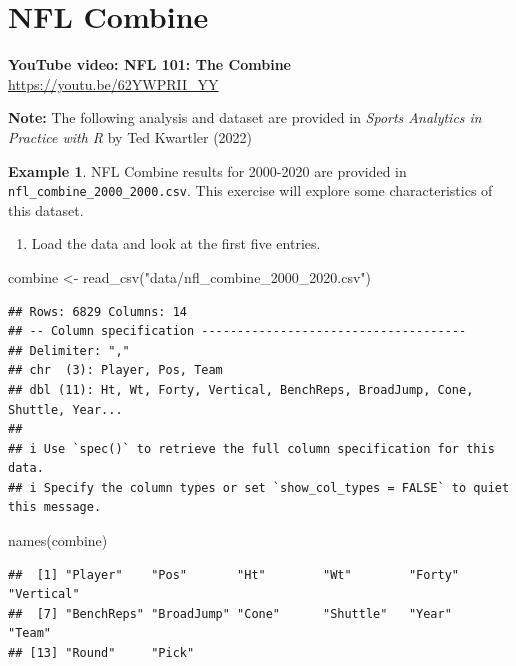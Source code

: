 \documentclass[
  11pt,
]{book}
\newenvironment{Shaded}{\begin{snugshade}}{\end{snugshade}}
\newcommand{\FunctionTok}[1]{\textcolor[rgb]{0.00,0.00,0.00}{#1}}
\newcommand{\NormalTok}[1]{#1}
\newcommand{\OtherTok}[1]{\textcolor[rgb]{0.56,0.35,0.01}{#1}}
\newcommand{\StringTok}[1]{\textcolor[rgb]{0.31,0.60,0.02}{#1}}
\providecommand{\tightlist}{%
  \setlength{\itemsep}{0pt}\setlength{\parskip}{0pt}}
\theoremstyle{definition}
\theoremstyle{definition}
\newtheorem{example}{Example}[chapter]
\theoremstyle{definition}
\theoremstyle{definition}
\theoremstyle{remark}
\begin{document}
\hypertarget{nfl-combine}{%
\section{NFL Combine}\label{nfl-combine}}

\textbf{YouTube video: NFL 101: The Combine}\\
\url{https://youtu.be/62YWPRII_YY}

\textbf{Note:} The following analysis and dataset are provided in \emph{Sports Analytics in Practice with R} by Ted Kwartler (2022)\\

\begin{example}
NFL Combine results for 2000-2020 are provided in \texttt{nfl\_combine\_2000\_2000.csv}. This exercise will explore some characteristics of this dataset.
\end{example}

\begin{enumerate}
\def\labelenumi{(\alph{enumi})}
\tightlist
\item
  Load the data and look at the first five entries.
\end{enumerate}

\begin{Shaded}
\begin{Highlighting}[]
\NormalTok{combine }\OtherTok{\textless{}{-}} \FunctionTok{read\_csv}\NormalTok{(}\StringTok{"data/nfl\_combine\_2000\_2020.csv"}\NormalTok{)}
\end{Highlighting}
\end{Shaded}

\begin{verbatim}
## Rows: 6829 Columns: 14
## -- Column specification -------------------------------------
## Delimiter: ","
## chr  (3): Player, Pos, Team
## dbl (11): Ht, Wt, Forty, Vertical, BenchReps, BroadJump, Cone, Shuttle, Year...
## 
## i Use `spec()` to retrieve the full column specification for this data.
## i Specify the column types or set `show_col_types = FALSE` to quiet this message.
\end{verbatim}

\begin{Shaded}
\begin{Highlighting}[]
\FunctionTok{names}\NormalTok{(combine)}
\end{Highlighting}
\end{Shaded}

\begin{verbatim}
##  [1] "Player"    "Pos"       "Ht"        "Wt"        "Forty"     "Vertical" 
##  [7] "BenchReps" "BroadJump" "Cone"      "Shuttle"   "Year"      "Team"     
## [13] "Round"     "Pick"
\end{verbatim}
\end{document}
